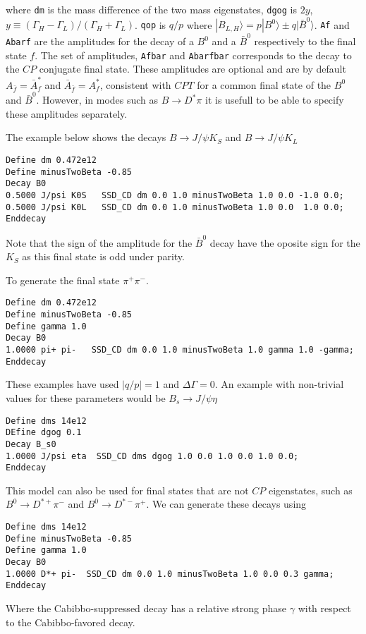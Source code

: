 where {\tt dm} is the mass difference of the two mass eigenstates, {\tt dgog} 
is $2y$, $y\equiv (\Gamma_H-\Gamma_L)/(\Gamma_H+\Gamma_L)$. {\tt qop} is
$q/p$ where $|B_{L,H}\rangle=p|B^0\rangle\pm q|\bar B^0\rangle$.
{\tt Af} and {\tt Abarf} are the amplitudes for the decay of a $B^0$ and a 
$\bar B^0$ respectively to the final state $f$. The set of amplitudes,
{\tt Afbar} and {\tt Abarfbar} corresponds to the decay to the 
$CP$ conjugate final state. These amplitudes are optional and are by
default $A_{\bar f}=\bar A^*_{f}$ and ${\bar A}_{\bar f}=A^*_f$,
consistent with $CPT$ for a common final state of the $B^0$ and $\bar B^0$.
However, in modes such as $B\to D^*\pi$ it is usefull to be able to 
specify these amplitudes separately. 

The example below shows the decays $B\to J/\psi K_S$ and $B\to J/\psi K_L$
\begin{verbatim}
Define dm 0.472e12
Define minusTwoBeta -0.85
Decay B0
0.5000 J/psi K0S   SSD_CD dm 0.0 1.0 minusTwoBeta 1.0 0.0 -1.0 0.0;
0.5000 J/psi K0L   SSD_CD dm 0.0 1.0 minusTwoBeta 1.0 0.0  1.0 0.0;
Enddecay
\end{verbatim}
Note that the sign of the amplitude for the $\bar B^0$ decay have the 
oposite sign for the $K_S$ as this final state is odd under parity.

To generate the final state $\pi^+\pi^-$. 
\begin{verbatim}
Define dm 0.472e12
Define minusTwoBeta -0.85
Define gamma 1.0
Decay B0
1.0000 pi+ pi-   SSD_CD dm 0.0 1.0 minusTwoBeta 1.0 gamma 1.0 -gamma;
Enddecay
\end{verbatim}
These examples have used $|q/p|=1$ and $\Delta\Gamma=0$. An
example with non-trivial values for these parameters
would be $B_s\to J/\psi \eta$
\begin{verbatim}
Define dms 14e12
DEfine dgog 0.1
Decay B_s0
1.0000 J/psi eta  SSD_CD dms dgog 1.0 0.0 1.0 0.0 1.0 0.0;
Enddecay
\end{verbatim}

This model can also be used for final states that are not $CP$
eigenstates, such as $B^0\to D^{*+}\pi^-$
and $B^0\to D^{*-}\pi^+$. We can generate these decays using
\begin{verbatim}
Define dms 14e12
Define minusTwoBeta -0.85
Define gamma 1.0
Decay B0
1.0000 D*+ pi-  SSD_CD dm 0.0 1.0 minusTwoBeta 1.0 0.0 0.3 gamma;
Enddecay
\end{verbatim}
Where the Cabibbo-suppressed decay has a relative strong phase $\gamma$ with
respect to the Cabibbo-favored decay.



